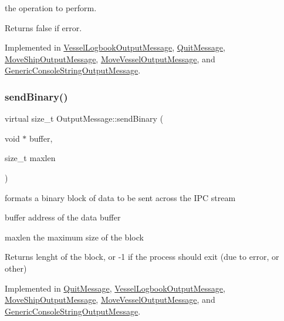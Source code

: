 the operation to perform. 

\begin{DoxyReturn}{Returns}
false if error. 
\end{DoxyReturn}


Implemented in \mbox{\hyperlink{class_vessel_logbook_output_message_a39a68c1cc103eef690f75c4881ceaee4}{Vessel\+Logbook\+Output\+Message}}, \mbox{\hyperlink{class_quit_message_ae1039b9a8fc00712a8161a3701f1fa2f}{Quit\+Message}}, \mbox{\hyperlink{class_move_ship_output_message_ad78fe623ef5cbb37133dc9f936005007}{Move\+Ship\+Output\+Message}}, \mbox{\hyperlink{class_move_vessel_output_message_a3b538a1080de230361cb875d7617c947}{Move\+Vessel\+Output\+Message}}, and \mbox{\hyperlink{class_generic_console_string_output_message_afd9c18543844626cb07d800e9f8b43a6}{Generic\+Console\+String\+Output\+Message}}.

\mbox{\label{class_output_message_a42e0a2560b1bf9e58b6626056f87b8c2}} 
\subsubsection{\texorpdfstring{sendBinary()}{sendBinary()}}
{\footnotesize\ttfamily virtual size\+\_\+t Output\+Message\+::send\+Binary (\begin{DoxyParamCaption}\item[{void $\ast$}]{buffer,  }\item[{size\+\_\+t}]{maxlen }\end{DoxyParamCaption})\hspace{0.3cm}{\ttfamily [pure virtual]}}



formats a binary block of data to be sent across the I\+PC stream 

\begin{DoxyItemize}
\item buffer address of the data buffer \item maxlen the maximum size of the block \begin{DoxyReturn}{Returns}
lenght of the block, or -\/1 if the process should exit (due to error, or other) 
\end{DoxyReturn}
\end{DoxyItemize}


Implemented in \mbox{\hyperlink{class_quit_message_ae36862391f3a9f21a67a76074e082fe6}{Quit\+Message}}, \mbox{\hyperlink{class_vessel_logbook_output_message_af1453fd8c283bbf6eb7f2ef00bc33a5f}{Vessel\+Logbook\+Output\+Message}}, \mbox{\hyperlink{class_move_ship_output_message_ad3240c1a180d35dbd950f5085d31a6ba}{Move\+Ship\+Output\+Message}}, \mbox{\hyperlink{class_move_vessel_output_message_adad3c956721e3470a6b8e5a35e8aac86}{Move\+Vessel\+Output\+Message}}, and \mbox{\hyperlink{class_generic_console_string_output_message_abc038d7b5db3a2b2835ea23ad35d77e9}{Generic\+Console\+String\+Output\+Message}}.



